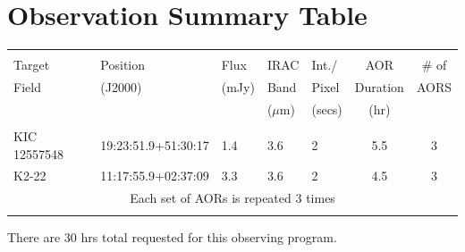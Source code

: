 \documentclass[letterpaper,12pt]{article}
\begin{document}
\section{Observation Summary Table}\label{sec:ObsSumm}




\bigskip
\begin{tabular}{lllllcc}
\hline \\ 
Target & Position & Flux     & IRAC  & Int./ & AOR & \# of \\
Field & (J2000)   & (mJy) & Band & Pixel & Duration & AORS \\
& &  & ($\mu$m) & (secs) & (hr) & \\
\hline \\ 
KIC 12557548 & 19:23:51.9+51:30:17 & 1.4 & 3.6 & 2 & 5.5 & 3 \\
K2-22 & 11:17:55.9+02:37:09 & 3.3 & 3.6 & 2 & 4.5 & 3 \\
\multicolumn{7}{c}{Each set of AORs is repeated 3 times} \\
\hline \\
\end{tabular}


There are 30 hrs total requested for this observing program.\newline

\end{document}
